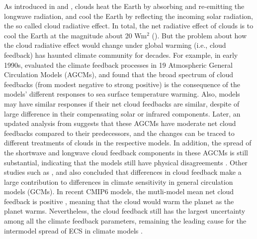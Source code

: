 As introduced in  and , clouds heat the Earth by absorbing and re-emitting the longwave radiation, and cool the Earth by reflecting the incoming solar radiation, the so called cloud radiative effect. In total, the net radiative effect of clouds is to cool the Earth at the magnitude about 20 Wm$^2$ (). But the problem about how the cloud radiative effect would change under global warming (i.e., cloud feedback) has haunted climate community for decades. For example, in early 1990s, \cite{Cess1990intercomparison} evaluated the climate feedback processes in 19 Atmospheric General Circulation Models (AGCMs), and found that the broad spectrum of cloud feedbacks (from modest negative to strong positive) is the consequence of the models' different responses to sea surface temperature warming. Also, models may have similar responses if their net cloud feedbacks are similar, despite of large difference in their compensating solar or infrared components. Later, an updated analysis from \cite{Cess1996cloud} suggests that these AGCMs have moderate net cloud feedbacks compared to their predecessors, and the changes can be traced to different treatments of clouds in the respective models. In addition, the spread of the shortwave and longwave cloud feedback components in these AGCMs is still substantial, indicating that the models still have physical disagreements \citep{Cess1996cloud}. Other studies such as \cite{Colman2003comparison}, \cite{Webb2006contribution} and \cite{Vial2013} also concluded that differences in cloud feedback make a large contribution to differences in climate sensitivity in general circulation models (GCMs). In recent CMIP6 models, the mutli-model mean net cloud feedback is positive \citep[see ;][]{Zelinka2020causes}, meaning that the cloud would warm the planet as the planet warms. Nevertheless, the cloud feedback still has the largest uncertainty among all the climate feedback parameters, remaining the leading cause for the intermodel spread of ECS in climate models \citep{Zelinka2020causes,Sherwood2020}. %


